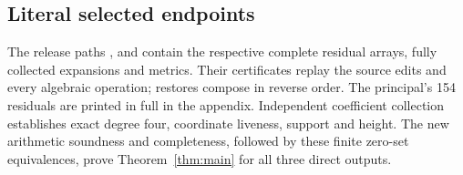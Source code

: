\subsection{Literal selected endpoints}
The release paths ,  and
 contain the respective complete residual arrays,
fully collected expansions and metrics. Their certificates replay the
source edits and every algebraic operation; restores compose in reverse
order. The principal's 154 residuals are printed in full in the appendix.
Independent coefficient collection establishes exact degree four,
coordinate liveness, support and height. The new arithmetic soundness
and completeness, followed by these finite zero-set equivalences, prove
Theorem~\ref{thm:main} for all three direct outputs.
